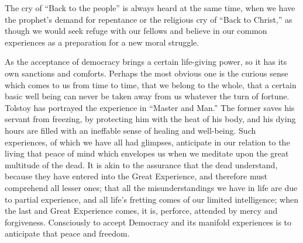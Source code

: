 \documentclass[]{article}
\begin{document}
\begin{sectionbody}
\addamsparagraph The cry of ``Back to the people'' is always heard at the same time, when
we have the prophet's demand for repentance or the religious cry of
``Back to Christ,'' as though we would seek refuge with our fellows and
believe in our common experiences as a preparation for a new moral
struggle.

\addamsparagraph As the acceptance of democracy brings a certain life-giving power, so it
has its own sanctions and comforts. Perhaps the most obvious one is the
curious sense which comes to us from time to time, that we belong to the
whole, that a certain basic well being can never be taken away from us
whatever the turn of fortune. Tolstoy has portrayed the experience in
``Master and Man.'' The former saves his servant from freezing, by
protecting him with the heat of his body, and his dying hours are filled
with an ineffable sense of healing and well-being. Such experiences, of
which we have all had glimpses, anticipate in our relation to the living
that peace of mind which envelopes us when we meditate upon the great
multitude of the dead. It is akin to the assurance that the dead
understand, because they have entered into the Great Experience, and
therefore must comprehend all lesser ones; that all the
misunderstandings we have in life are due to partial experience, and
all life's fretting comes of our limited intelligence; when the last and
Great Experience comes, it is, perforce, attended by mercy and
forgiveness. Consciously to accept Democracy and its manifold
experiences is to anticipate that peace and freedom.
\end{sectionbody}
\end{document}

